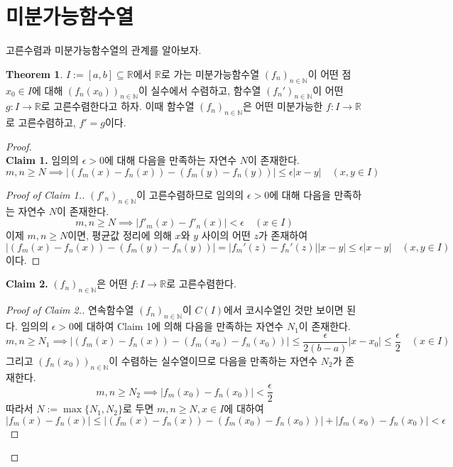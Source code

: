 \documentclass[11pt]{book}
\numberwithin{equation}{chapter}
\def\NN{\mathbb{N}}
\def\RR{\mathbb{R}}
\def\eps{\epsilon}
\newcommand{\abs}[1]{\left\vert#1\right\vert}
\theoremstyle{definition}
\newtheorem{thm}{Theorem}[section]
\begin{document}
\section{미분가능함수열}

고른수렴과 미분가능함수열의 관계를 알아보자.

\begin{thm} \label{12.1.1}
    \(I := [a, b] \subseteq \RR\)에서 \(\RR\)로 가는 미분가능함수열 \((f_n)_{n \in \NN}\)이 어떤 점 \(x_0 \in I\)에 대해 \((f_n(x_0))_{n \in \NN}\)이 실수에서 수렴하고, 함수열 \((f_n')_{n \in \NN}\)이 어떤 \(g : I \to \RR\)로 고른수렴한다고 하자. 이때 함수열 \((f_n)_{n \in \NN}\)은 어떤 미분가능한 \(f : I \to \RR\)로 고른수렴하고, \(f' = g\)이다.
\end{thm}

\begin{proof}
    \quad\\
    \textbf{Claim 1.} 임의의 \(\eps > 0\)에 대해 다음을 만족하는 자연수 \(N\)이 존재한다.
    \[
    m, n \ge N \implies \abs{(f_m(x) - f_n(x)) - (f_m(y) - f_n(y))} \le \eps \abs{x - y} \quad (x, y \in I)
    \]
    \begin{proof}[Proof of Claim 1.]
        \((f'_n)_{n \in \NN}\)이 고른수렴하므로 임의의 \(\eps > 0\)에 대해 다음을 만족하는 자연수 \(N\)이 존재한다.
        \[
        m, n \ge N \implies \abs{f'_m(x) - f'_n(x)} < \eps \quad (x \in I)    
        \]
        이제 \(m, n \ge N\)이면, 평균값 정리에 의해 \(x\)와 \(y\) 사이의 어떤 \(z\)가 존재하여
        \[
            \abs{(f_m(x) - f_n(x)) - (f_m(y) - f_n(y))} = \abs{f_m'(z) - f_n'(z)}\abs{x-y} \le \eps\abs{x - y} \quad (x, y \in I)
        \]
        이다.
    \end{proof}
    \noindent\textbf{Claim 2.} \((f_n)_{n \in \NN}\)은 어떤 \(f : I \to \RR\)로 고른수렴한다.
    \begin{proof}[Proof of Claim 2.]
        연속함수열 \((f_n)_{n \in \NN}\)이 \(C(I)\)에서 코시수열인 것만 보이면 된다. 임의의 \(\eps > 0\)에 대하여 Claim 1에 의해 다음을 만족하는 자연수 \(N_1\)이 존재한다.
        \[
        m, n \ge N_1 \implies \abs{(f_m(x) - f_n(x)) - (f_m(x_0) - f_n(x_0))} \le \frac{\eps}{2(b-a)}\abs{x-x_0} \le \frac{\eps}{2} \quad (x \in I)
        \]
        그리고 \((f_n(x_0))_{n \in \NN}\)이 수렴하는 실수열이므로 다음을 만족하는 자연수 \(N_2\)가 존재한다.
        \[
        m, n \ge N_2 \implies \abs{f_m(x_0) - f_n(x_0)} < \frac{\eps}{2}    
        \]
        따라서 \(N := \max\{N_1, N_2\}\)로 두면 \(m, n \ge N, x \in I\)에 대하여
        \[
        \abs{f_m(x) - f_n(x)} \le \abs{(f_m(x) - f_n(x)) - (f_m(x_0) - f_n(x_0))} + \abs{f_m(x_0) - f_n(x_0)} < \eps
\]
\end{proof}
\end{proof}
\end{document}
